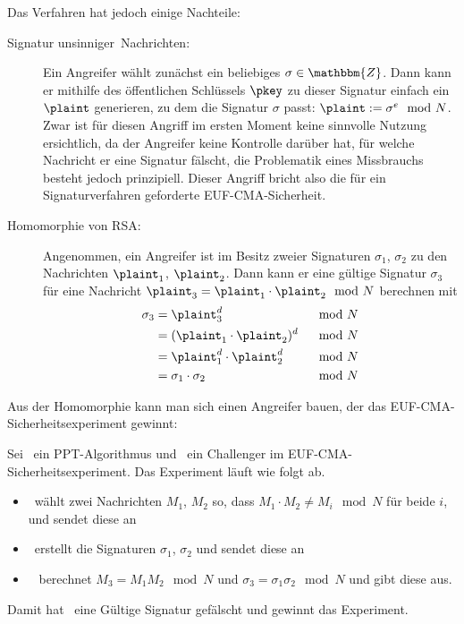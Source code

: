 Das Verfahren hat jedoch einige Nachteile:
\begin{description}
    \item[Signatur \glqq unsinniger\grqq~Nachrichten:] Ein Angreifer
      wählt zunächst ein beliebiges $\sigma \in \mathbbm{Z}$. Dann kann
      er mithilfe des öffentlichen Schlüssels $\pkey$ zu dieser Signatur
      einfach ein $\plaint$ generieren, zu dem die Signatur $\sigma$
      passt: $\plaint := \sigma^e \mod N$.\\ 
    Zwar ist für diesen Angriff im ersten Moment keine sinnvolle Nutzung
    ersichtlich, da der Angreifer keine Kontrolle darüber hat, für
    welche Nachricht er eine Signatur fälscht, die Problematik eines
    Missbrauchs besteht jedoch prinzipiell. Dieser Angriff bricht also
    die für ein Signaturverfahren geforderte EUF-CMA-Sicherheit.
  \item[Homomorphie von RSA:] Angenommen, ein Angreifer ist im Besitz
    zweier Signaturen $\sigma_1$, $\sigma_2$ zu den Nachrichten
    $\plaint_1$, $\plaint_2$. Dann kann er eine gültige Signatur
    $\sigma_3$ für
    eine Nachricht $\plaint_3 = \plaint_1 \cdot \plaint_2 \mod N$
    berechnen mit
    \begin{alignat*}{2}
      \sigma_3 &= \plaint_3^d  & \mod N\\
               &=  (\plaint_1 \cdot \plaint_2)^d & \mod N \\
               &= \plaint_1^d \cdot \plaint_2^d &\mod N\\
               &= \sigma_1 \cdot \sigma_2 &\mod N
    \end{alignat*}
  \end{description}
  Aus der Homomorphie kann man sich einen Angreifer bauen, der das
  EUF-CMA-Sicherheits\-experiment gewinnt: 
  \begin{beispiel}
    Sei \A~ein PPT-Algorithmus und \C~ein Challenger im
    EUF-CMA-Sicherheits\-experiment. Das Experiment läuft wie folgt ab.
    \begin{itemize}
    \item \A~wählt zwei Nachrichten $M_1$, $M_2$ so, dass $ M_1\cdot M_2
      \neq M_i \mod N$ für beide $i$, und sendet diese an \C
    \item \C~erstellt die Signaturen $\sigma_1$, $\sigma_2$ und sendet
      diese an \A
    \item \A~ berechnet $M_3=M_1M_2 \mod N$ und
      $\sigma_3=\sigma_1\sigma_2 \mod N$ und gibt diese aus.
    \end{itemize}
    Damit hat \A~eine Gültige Signatur gefälscht und gewinnt das Experiment.
  \end{beispiel}
